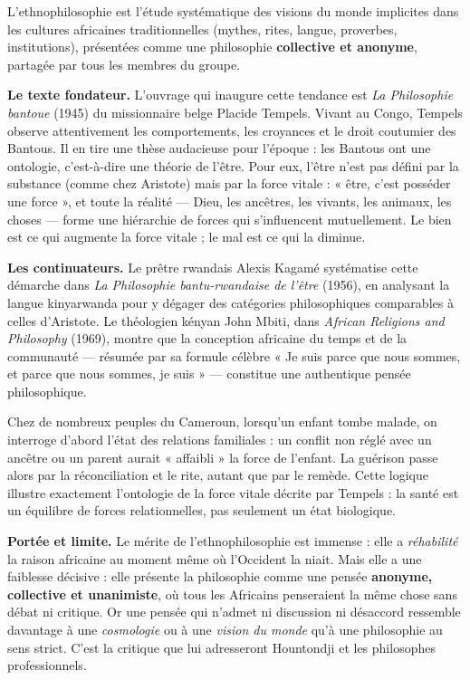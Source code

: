 \documentclass[11pt]{article}
\newcommand{\cle}[1]{{\popxbold\color{popdark}#1}}
\begin{document}
\begin{definition}[L'ethnophilosophie]
L'\cle{ethnophilosophie} est l'étude systématique des visions du monde implicites dans les cultures africaines traditionnelles (mythes, rites, langue, proverbes, institutions), présentées comme une philosophie \textbf{collective et anonyme}, partagée par tous les membres du groupe.
\end{definition}

\textbf{Le texte fondateur.} L'ouvrage qui inaugure cette tendance est \emph{La Philosophie bantoue} (1945) du missionnaire belge Placide \cle{Tempels}. Vivant au Congo, Tempels observe attentivement les comportements, les croyances et le droit coutumier des Bantous. Il en tire une thèse audacieuse pour l'époque : les Bantous ont une ontologie, c'est-à-dire une théorie de l'être. Pour eux, l'être n'est pas défini par la substance (comme chez Aristote) mais par la \cle{force vitale} : « être, c'est posséder une force », et toute la réalité — Dieu, les ancêtres, les vivants, les animaux, les choses — forme une hiérarchie de forces qui s'influencent mutuellement. Le bien est ce qui augmente la force vitale ; le mal est ce qui la diminue.

\textbf{Les continuateurs.} Le prêtre rwandais Alexis \cle{Kagamé} systématise cette démarche dans \emph{La Philosophie bantu-rwandaise de l'être} (1956), en analysant la langue kinyarwanda pour y dégager des catégories philosophiques comparables à celles d'Aristote. Le théologien kényan John \cle{Mbiti}, dans \emph{African Religions and Philosophy} (1969), montre que la conception africaine du temps et de la communauté — résumée par sa formule célèbre « Je suis parce que nous sommes, et parce que nous sommes, je suis » — constitue une authentique pensée philosophique.

\begin{exemplebox}
Chez de nombreux peuples du Cameroun, lorsqu'un enfant tombe malade, on interroge d'abord l'état des relations familiales : un conflit non réglé avec un ancêtre ou un parent aurait « affaibli » la force de l'enfant. La guérison passe alors par la réconciliation et le rite, autant que par le remède. Cette logique illustre exactement l'ontologie de la force vitale décrite par Tempels : la santé est un équilibre de forces relationnelles, pas seulement un état biologique.
\end{exemplebox}

\textbf{Portée et limite.} Le mérite de l'ethnophilosophie est immense : elle a \emph{réhabilité} la raison africaine au moment même où l'Occident la niait. Mais elle a une faiblesse décisive : elle présente la philosophie comme une pensée \textbf{anonyme, collective et unanimiste}, où tous les Africains penseraient la même chose sans débat ni critique. Or une pensée qui n'admet ni discussion ni désaccord ressemble davantage à une \emph{cosmologie} ou à une \emph{vision du monde} qu'à une philosophie au sens strict. C'est la critique que lui adresseront Hountondji et les philosophes professionnels.
\end{document}
